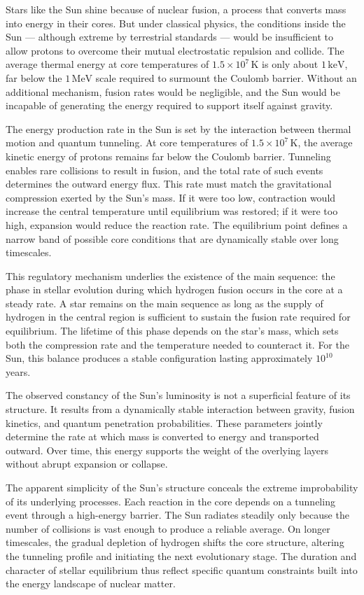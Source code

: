 Stars like the Sun shine because of nuclear fusion, a process that converts mass into energy in their cores. But under classical physics, the conditions inside the Sun — although extreme by terrestrial standards — would be insufficient to allow protons to overcome their mutual electrostatic repulsion and collide. The average thermal energy at core temperatures of $1.5 \times 10^7\,\text{K}$ is only about $1\,\text{keV}$, far below the $1\,\text{MeV}$ scale required to surmount the Coulomb barrier. Without an additional mechanism, fusion rates would be negligible, and the Sun would be incapable of generating the energy required to support itself against gravity.

The energy production rate in the Sun is set by the interaction between thermal motion and quantum tunneling. At core temperatures of $1.5 \times 10^7\,\text{K}$, the average kinetic energy of protons remains far below the Coulomb barrier. Tunneling enables rare collisions to result in fusion, and the total rate of such events determines the outward energy flux. This rate must match the gravitational compression exerted by the Sun’s mass. If it were too low, contraction would increase the central temperature until equilibrium was restored; if it were too high, expansion would reduce the reaction rate. The equilibrium point defines a narrow band of possible core conditions that are dynamically stable over long timescales.

This regulatory mechanism underlies the existence of the main sequence: the phase in stellar evolution during which hydrogen fusion occurs in the core at a steady rate. A star remains on the main sequence as long as the supply of hydrogen in the central region is sufficient to sustain the fusion rate required for equilibrium. The lifetime of this phase depends on the star’s mass, which sets both the compression rate and the temperature needed to counteract it. For the Sun, this balance produces a stable configuration lasting approximately $10^{10}$ years.

The observed constancy of the Sun’s luminosity is not a superficial feature of its structure. It results from a dynamically stable interaction between gravity, fusion kinetics, and quantum penetration probabilities. These parameters jointly determine the rate at which mass is converted to energy and transported outward. Over time, this energy supports the weight of the overlying layers without abrupt expansion or collapse.

The apparent simplicity of the Sun’s structure conceals the extreme improbability of its underlying processes. Each reaction in the core depends on a tunneling event through a high-energy barrier. The Sun radiates steadily only because the number of collisions is vast enough to produce a reliable average. On longer timescales, the gradual depletion of hydrogen shifts the core structure, altering the tunneling profile and initiating the next evolutionary stage. The duration and character of stellar equilibrium thus reflect specific quantum constraints built into the energy landscape of nuclear matter.

